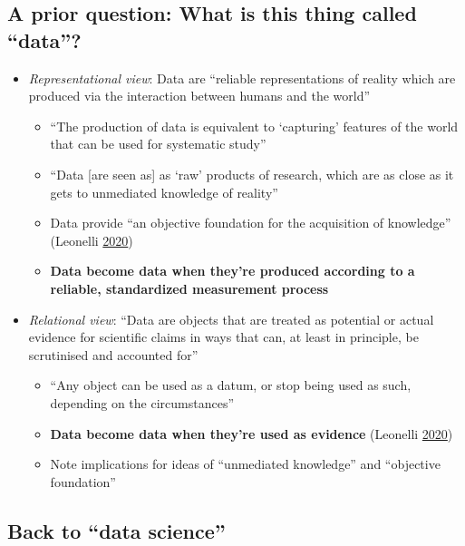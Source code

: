 \documentclass[
]{article}
\providecommand{\tightlist}{%
  \setlength{\itemsep}{0pt}\setlength{\parskip}{0pt}}
\begin{document}
\hypertarget{a-prior-question-what-is-this-thing-called-data}{%
\subsection{A prior question: What is this thing called ``data''?}\label{a-prior-question-what-is-this-thing-called-data}}

\begin{itemize}
\tightlist
\item
  \emph{Representational view}: Data are ``reliable representations of reality which are produced via the interaction between humans and the world''

  \begin{itemize}
  \tightlist
  \item
    ``The production of data is equivalent to `capturing' features of the world that can be used for systematic study''
  \item
    ``Data {[}are seen as{]} as `raw' products of research, which are as close as it gets to unmediated knowledge of reality''
  \item
    Data provide ``an objective foundation for the acquisition of knowledge'' (Leonelli \protect\hyperlink{ref-LeonelliScientificResearchBig2020}{2020})
  \item
    \textbf{Data become data when they're produced according to a reliable, standardized measurement process}
  \end{itemize}
\item
  \emph{Relational view}: ``Data are objects that are treated as potential or actual evidence for scientific claims in ways that can, at least in principle, be scrutinised and accounted for''

  \begin{itemize}
  \tightlist
  \item
    ``Any object can be used as a datum, or stop being used as such, depending on the circumstances''
  \item
    \textbf{Data become data when they're used as evidence} (Leonelli \protect\hyperlink{ref-LeonelliScientificResearchBig2020}{2020})
  \item
    Note implications for ideas of ``unmediated knowledge'' and ``objective foundation''
  \end{itemize}
\end{itemize}

\hypertarget{back-to-data-science}{%
\subsection{Back to ``data science''}\label{back-to-data-science}}
\end{document}
